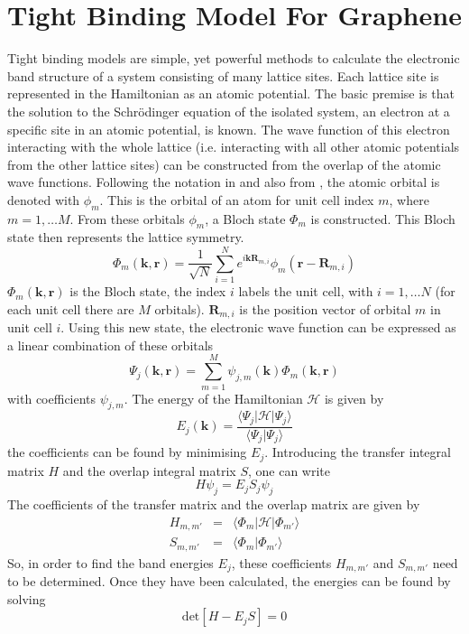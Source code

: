 \section{Tight Binding Model For Graphene}
Tight binding models are simple, yet powerful methods to calculate the electronic band structure of a system consisting of many lattice sites. Each lattice site is represented in the Hamiltonian as an atomic potential. 
The basic premise is that the solution to the Schr\"odinger equation of the isolated system, an electron at a specific site in an atomic potential, is known. The wave function of this electron interacting with the whole lattice (i.e. interacting with all other atomic potentials from the other lattice sites) can be constructed from the overlap of the atomic wave functions. 
Following the notation in \cite{McCann2012} and also from \cite{CastroNeto2009}, the atomic orbital is denoted with $\phi_m$. This is the orbital of an atom for unit cell index $m$, where $m = 1, \dots M$. From these orbitals $\phi_m$, a Bloch state $\Phi_m$ is constructed. This Bloch state then represents the lattice symmetry.
\begin{equation}
\Phi_m \left( \mathbf{k}, \mathbf{r} \right) = \frac{1}{\sqrt{N}} \sum_{i = 1}^N e^{i \mathbf{k} \mathbf{R}_{m, i}} \phi _m \left( \mathbf{r} - \mathbf{R}_{m, i} \right)
\end{equation}
$\Phi_m \left( \mathbf{k}, \mathbf{r} \right)$ is the Bloch state, the index $i$ labels the unit cell, with $i = 1, \dots N$ (for each unit cell there are $M$ orbitals). $\mathbf{R}_{m, i}$ is the position vector of orbital $m$ in unit cell $i$. Using this new state, the electronic wave function can be expressed as a linear combination of these orbitals
\begin{equation}
\Psi_j \left( \mathbf{k}, \mathbf{r} \right) = \sum_{m=1}^M \psi_{j, m} \left( \mathbf{k} \right) \Phi_m \left( \mathbf{k}, \mathbf{r} \right) 
\end{equation}
with coefficients $\psi_{j, m}$.
The energy of the Hamiltonian $\mathcal{H}$ is given by 
\begin{equation}
E_j \left( \mathbf{k} \right) = \frac{\langle \Psi_j| \mathcal{H} | \Psi_j \rangle}{\langle \Psi_j | \Psi_j \rangle}
\end{equation}
the coefficients can be found by minimising $E_j$. Introducing the transfer integral matrix $H$ and the overlap integral matrix $S$, one can write
\begin{equation}
H \psi_j =  E_j S_j \psi_j
\end{equation}
The coefficients of the transfer matrix and the overlap matrix are given by
\begin{eqnarray}
H_{m, m'} &=& \langle \Phi_m | \mathcal{H} | \Phi_{m'} \rangle \\
S_{m, m'} &=& \langle \Phi_m | \Phi_{m'}\rangle
\end{eqnarray}
So, in order to find the band energies $E_j$, these coefficients $H_{m, m'}$ and $S_{m, m'}$ need to be determined. Once they have been calculated, the energies can be found by solving
\begin{equation}
\text{det} \left[ H - E_j S \right] = 0
\end{equation}

